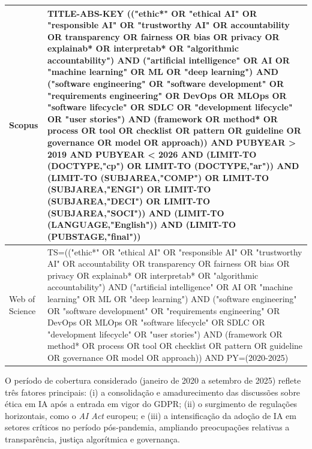 \begin{table}[htbp]
\begin{tabular}{p{1.5cm}p{12.5cm}}
    \hline
    \addlinespace
    Scopus & TITLE-ABS-KEY (("ethic*" OR "ethical AI" OR "responsible AI" OR "trustworthy AI" OR accountability OR transparency OR fairness OR bias OR privacy OR explainab* OR interpretab* OR "algorithmic accountability") AND ("artificial intelligence" OR AI OR "machine learning" OR ML OR "deep learning") AND ("software engineering" OR "software development" OR "requirements engineering" OR DevOps OR MLOps OR "software lifecycle" OR SDLC OR "development lifecycle" OR "user stories") AND (framework OR method* OR process OR tool OR checklist OR pattern OR guideline OR governance OR model OR approach)) AND PUBYEAR > 2019 AND PUBYEAR < 2026 AND (LIMIT-TO (DOCTYPE,"cp") OR LIMIT-TO (DOCTYPE,"ar")) AND (LIMIT-TO (SUBJAREA,"COMP") OR LIMIT-TO (SUBJAREA,"ENGI") OR LIMIT-TO (SUBJAREA,"DECI") OR LIMIT-TO (SUBJAREA,"SOCI")) AND (LIMIT-TO (LANGUAGE,"English")) AND (LIMIT-TO (PUBSTAGE,"final")) \\
    \hline
    \addlinespace
    Web of Science & TS=(("ethic*" OR "ethical AI" OR "responsible AI" OR "trustworthy AI" OR accountability OR transparency OR fairness OR bias OR privacy OR explainab* OR interpretab* OR "algorithmic accountability") AND ("artificial intelligence" OR AI OR "machine learning" OR ML OR "deep learning") AND ("software engineering" OR "software development" OR "requirements engineering" OR DevOps OR MLOps OR "software lifecycle" OR SDLC OR "development lifecycle" OR "user stories") AND (framework OR method* OR process OR tool OR checklist OR pattern OR guideline OR governance OR model OR approach)) AND PY=(2020-2025) \\
  \hline
\end{tabular}
\end{table}

O período de cobertura considerado (janeiro de 2020 a setembro de 2025) reflete três fatores principais: (i) a consolidação e amadurecimento das discussões sobre ética em IA após a entrada em vigor do GDPR\cite{GDPR2016}; (ii) o surgimento de regulações horizontais, como o \textit{AI Act} europeu\cite{EUAIAct2024}; e (iii) a intensificação da adoção de IA em setores críticos no período pós-pandemia, ampliando preocupações relativas a transparência, justiça algorítmica e governança.





